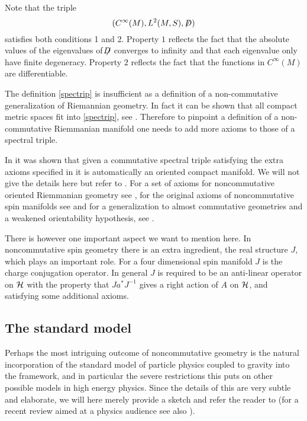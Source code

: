 \documentclass[12pt]{article}
\def\ch{{\cal H}}
\begin{document}
 Note that  the triple 
 $$(C^\infty (M), L^2(M,S),  \not\hspace{-1mm} D)$$ satisfies both conditions 1 and 2.  Property $1$ reflects the fact that the absolute values of the eigenvalues of $ \not\hspace{-1.8mm} D$ converges to infinity and that each eigenvalue only have finite degeneracy. Property $2$ reflects the fact that the functions in $C^\infty (M)$ are differentiable.   




The definition \ref{spectrip} is insufficient as a definition of a non-commutative generalization of Riemannian geometry. In fact it can be shown that all compact metric spaces fit into \ref{spectrip}, see \cite{ChrisIvan}. Therefore to pinpoint a definition of a non-commutative Riemmanian  manifold one needs to add more axioms to those of a spectral triple. 

In \cite{ConnesRecon} it was shown that given a commutative spectral triple satisfying the extra axioms specified in \cite{ConnesRecon} it is automatically an oriented compact manifold. 
We will not give the details here but refer to \cite{ConnesRecon}. For a set of axioms for noncommutative oriented Riemmanian geometry see \cite{LRV},  for the original axioms of noncommutative spin manifolds see \cite{Connes:1996gi} and for a generalization to almost commutative geometries and a weakened orientability hypothesis, see \cite{cacic}. 

There is however one important aspect we want to mention here. In noncommutative spin geometry there is an extra ingredient, the real structure $J$, which plays an important role. For a four dimensional spin manifold $J$ is the charge conjugation operator. In general $J$ is required to be an anti-linear operator on $\ch$ with the property that $Ja^*J^{-1}$ gives a right action of $A$ on $\ch$, and satisfying some additional axioms.    




\subsection{The standard model}   
Perhaps the most intriguing outcome of noncommutative geometry is the natural incorporation of the standard model of particle physics coupled to gravity into the framework, and in particular the severe restrictions this puts on other possible models in high energy physics. Since the details of this are very subtle and elaborate,  we will here merely provide a sketch and refer the reader to \cite{Chamseddine:2006ep,Chamseddine:2012sw} (for a recent review aimed at a physics audience see also \cite{Dungen:2012ky}).
\end{document}
